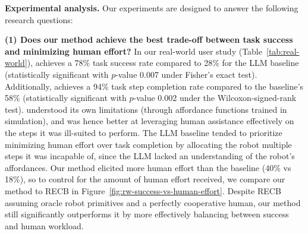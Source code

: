 



\textbf{Experimental analysis.} Our experiments are designed to answer the following research questions:


\textbf{(1) Does our method achieve the best trade-off between task success and minimizing human effort?}
In our real-world user study (Table~\ref{tab:real-world}), \methodname{} achieves a 78\% task success rate compared to 28\% for the LLM baseline (statistically significant with $p$-value 0.007 under Fisher's exact test). Additionally, \methodname{} achieves a 94\% task step completion rate compared to the baseline's 58\% (statistically significant with $p$-value 0.002 under the Wilcoxon-signed-rank test). \ours{} understood its own limitations (through affordance functions trained in simulation), and was hence better at leveraging human assistance effectively on the steps it was ill-suited to perform.
The LLM baseline tended to prioritize minimizing human effort over task completion by allocating the robot multiple steps it was incapable of, since the LLM lacked an understanding of the robot's affordances.
Our method elicited more human effort than the baseline (40\% vs 18\%), so to control for the amount of human effort received, we compare our method to RECB in Figure~\ref{fig:rw-success-vs-human-effort}.
Despite RECB assuming oracle robot primitives and a perfectly cooperative human, our method still significantly outperforms it by more effectively balancing between success and human workload.

